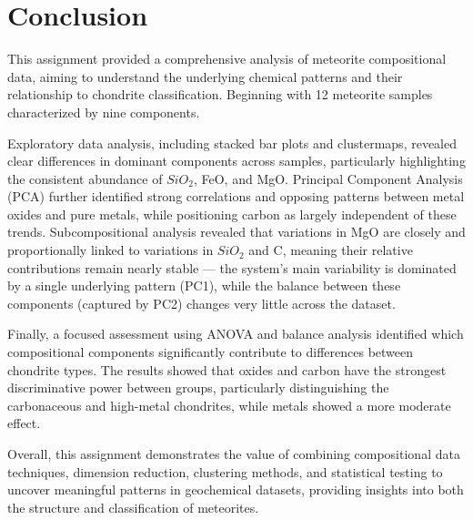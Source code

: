 \section{Conclusion}

This assignment provided a comprehensive analysis of meteorite compositional data, aiming to understand the underlying chemical patterns and their relationship to chondrite classification. Beginning with 12 meteorite samples characterized by nine components. 

Exploratory data analysis, including stacked bar plots and clustermaps, revealed clear differences in dominant components across samples, particularly highlighting the consistent abundance of $SiO_2$, FeO, and MgO. Principal Component Analysis (PCA) further identified strong correlations and opposing patterns between metal oxides and pure metals, while positioning carbon as largely independent of these trends. Subcompositional analysis revealed that variations in MgO are closely and proportionally linked to variations in $SiO_2$ and C, meaning their relative contributions remain nearly stable — the system's main variability is dominated by a single underlying pattern (PC1), while the balance between these components (captured by PC2) changes very little across the dataset.
 
Finally, a focused assessment using ANOVA and balance analysis identified which compositional components significantly contribute to differences between chondrite types. The results showed that oxides and carbon have the strongest discriminative power between groups, particularly distinguishing the carbonaceous and high-metal chondrites, while metals showed a more moderate effect.

Overall, this assignment demonstrates the value of combining compositional data techniques, dimension reduction, clustering methods, and statistical testing to uncover meaningful patterns in geochemical datasets, providing insights into both the structure and classification of meteorites.
